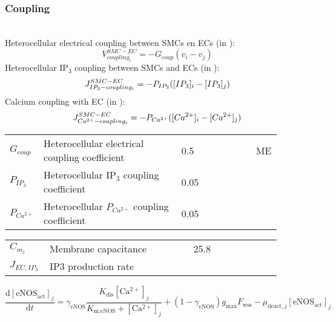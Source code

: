 \documentclass[fleqn]{report}
\numberwithin{equation}{section}
\numberwithin{equation}{section}
\newcommand{\eNOSact}{\text{eNOS$_{\text{act}}$}}
\newcommand{\Ca}{\text{Ca$^{2+}$}}
\begin{document}
	\subsubsection*{Coupling}~\\
	Heterocellular electrical coupling between SMCs en ECs (in \mVs):
	\begin{equation} \label{eq:Vcouplingi}
	V_{coupling_{i}}^{SMC-EC}= -G_{coup}(v_{i}-v_{j})
	\end{equation}
	Heterocellular IP$_{3}$ coupling between SMCs and ECs (in \uMs):
	\begin{equation} \label{eq:JIP3couplingi}
	J_{IP_{3}-coupling_{i}}^{SMC-EC}= -P_{IP_{3}}([IP_{3}]_{i}-[IP_{3}]_{j})
	\end{equation}
	Calcium coupling with EC (in \uMs):
	\begin{equation} \label{eq:JCAcouplingi}
	J_{Ca^{2+}-coupling_{i}}^{SMC-EC}= -P_{Ca^{2+}}([Ca^{2+}]_{i}-[Ca^{2+}]_{j})
	\end{equation}
	\begin{table}[h!]
	\centering
	\begin{tabular}{ p{0.09\linewidth}  >{\footnotesize} p{0.5\linewidth}  >{\footnotesize} p{0.27\linewidth} >{\footnotesize} p{0.03\linewidth} }
	\hline
	$G_{coup}$      		& Heterocellular electrical coupling coefficient		& 0.5 \pers	& ME \\
	$P_{IP_{3}}$      		& Heterocellular IP$_{3}$ coupling coefficient	& 0.05 \pers	&  \cite{Koenigsberger2006} \\
	$P_{Ca^{2+}}$      		& Heterocellular $P_{Ca^{2+}}$ coupling coefficient	& 0.05 \pers	&  \cite{Koenigsberger2006} \\
	\hline
	\end{tabular}
	\label{tab:JCA3couplingi}
	\end{table}
	
	\begin{table}[h!]
	\centering
	\begin{tabular}{ p{0.09\linewidth}  >{\footnotesize} p{0.5\linewidth}  >{\footnotesize} p{0.27\linewidth} >{\footnotesize} p{0.03\linewidth} }
	\hline
	 $C_{m_{j}}$				& Membrane capacitance												& 25.8  \pF		& \cite{Koenigsberger2006} \\
	 $ J_{EC,IP_3} $  & \gls{IP3} production rate & \uMps & \cite{Koenigsberger2006}  \\
	\hline
	\end{tabular}
	\label{tab:JSRuptakei}
	\end{table}
	\begin{equation} 
					\dfrac{\mathrm{d}[\eNOSact]_j}{\mathrm{d}t} = \gamma_{\text{eNOS}} \frac{K_{\text{dis}}[\Ca]_j}{K_{\text{m,eNOS}}+[\Ca]_j} + (1-\gamma_{\text{eNOS}}) g_{\max} F_{\text{wss}}   - \mu_{\text{deact},j}[\eNOSact]_j
				\end{equation}	
						
\end{document}
